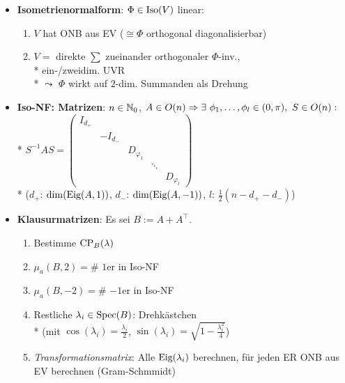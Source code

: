 \begin{itemize}
	\item \textbf{Isometrienormalform}: \( \Phi \in \text{Iso}(V) \) linear:
		\begin{enumerate}
			\item \( V \) hat ONB aus EV (\( \cong \Phi \) orthogonal diagonalisierbar)
			\item \( V =  \) direkte \( \sum \) zueinander orthogonaler \( \Phi \)-inv., \\* ein-/zweidim. UVR
				\\*
				\( \leadsto \) \( \Phi \) wirkt auf \( 2 \)-dim. Summanden als Drehung
		\end{enumerate}

	\item \textbf{Iso-NF: Matrizen}: \( n \in \mathbb{N}_0 \), \( A \in O(n) \\* \Rightarrow \exists \ \phi_1, \dots, \phi_l \in (0,\pi), \ S \in O(n): \)
		\\*
		\( S^{-1}AS = \left( \begin{smallmatrix}
			I_{d_+} & & & &  \\
			 & -I_{d_-} & & &  \\
			 & & D_{\varphi_1} & &  \\
			 & & & \ddots &  \\
			 & & & & D_{\varphi_l}
		\end{smallmatrix} \right) \)
		\\*
		(\( d_+ \): \( \dim(\text{Eig}(A,1)) \), \( d_- \): \( \dim(\text{Eig}(A,-1)) \), \( l \): \( \tfrac{1}{2}(n-d_+-d_-) \))
	\item \textbf{Klausurmatrizen}: Es sei \( B := A + A^\top  \).
		\begin{enumerate}
			\item Bestimme \( \text{CP}_B(\lambda) \)
			\item \( \mu_a(B,2) = \# \) \( 1 \)er in Iso-NF
			\item \( \mu_a(B,-2) = \# \) \( -1 \)er in Iso-NF
			\item Restliche \( \lambda_i \in \text{Spec}(B) \): Drehkästchen \\* (mit \( \cos(\lambda_i) = \tfrac{\lambda_i}{2} \), \( \sin(\lambda_i) = \sqrt{1-\tfrac{\lambda_i^2}{4}} \))
			\item \emph{Transformationsmatrix}: Alle \( \text{Eig}(\lambda_i) \) berechnen, für jeden ER ONB aus EV berechnen (Gram-Schmmidt)
		\end{enumerate}
\end{itemize}

